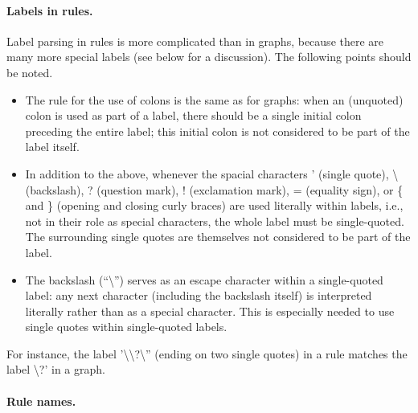 
\paragraph{Labels in rules.}

Label parsing in rules is more complicated than in graphs, because there are
many more special labels (see below for a discussion). The following points
should be noted.
%
\begin{itemize}\noitemsep
\item The rule for the use of colons is the same as for graphs: when an
  (unquoted) colon is used as part of a label, there should be a single initial
  colon preceding the entire label; this initial colon is not considered to be
  part of the label itself.

\item In addition to the above, whenever the spacial characters \textsf{'}
  (single quote), \textsf{\textbackslash} (backslash), \textsf{?} (question
  mark), \textsf{!}  (exclamation mark), \textsf{=} (equality sign), or
  \textsf{\{} and \textsf{\}} (opening and closing curly braces) are used
  literally within labels, i.e., not in their role as special characters, the
  whole label must be single-quoted. The surrounding single quotes are
  themselves not considered to be part of the label.

\item The backslash (``\textsf{\textbackslash}'') serves as an escape character
  within a single-quoted label: any next character (including the backslash
  itself) is interpreted literally rather than as a special character. This is
  especially needed to use single quotes within single-quoted labels.
\end{itemize}
%
For instance, the label \textsf{'\textbackslash\textbackslash?\textbackslash''}
(ending on two single quotes) in a rule matches the label
\textsf{\textbackslash?'} in a graph.

\paragraph{Rule names.}

